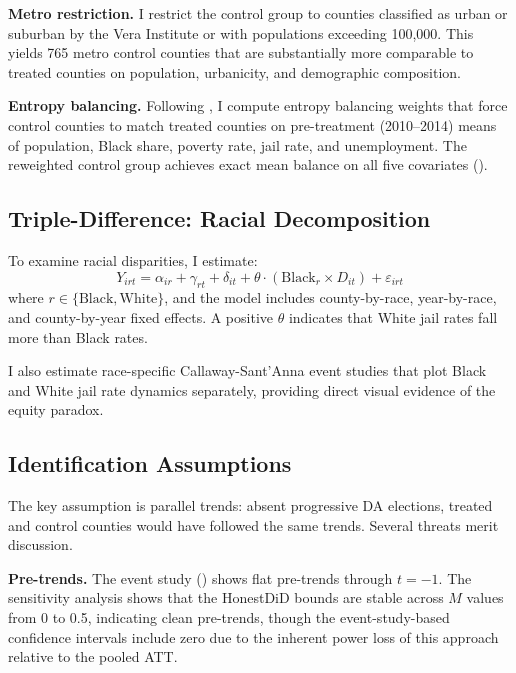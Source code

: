 \documentclass[12pt]{article}
\begin{document}
\textbf{Metro restriction.} I restrict the control group to counties classified as urban or suburban by the Vera Institute or with populations exceeding 100,000. This yields 765 metro control counties that are substantially more comparable to treated counties on population, urbanicity, and demographic composition.

\textbf{Entropy balancing.} Following \citet{hainmueller2012entropy}, I compute entropy balancing weights that force control counties to match treated counties on pre-treatment (2010--2014) means of population, Black share, poverty rate, jail rate, and unemployment. The reweighted control group achieves exact mean balance on all five covariates ().

\subsection{Triple-Difference: Racial Decomposition}

To examine racial disparities, I estimate:
\begin{equation}
Y_{irt} = \alpha_{ir} + \gamma_{rt} + \delta_{it} + \theta \cdot (\text{Black}_r \times D_{it}) + \varepsilon_{irt}
\label{eq:ddd}
\end{equation}
where $r \in \{\text{Black}, \text{White}\}$, and the model includes county-by-race, year-by-race, and county-by-year fixed effects. A positive $\theta$ indicates that White jail rates fall more than Black rates.

I also estimate race-specific Callaway-Sant'Anna event studies that plot Black and White jail rate dynamics separately, providing direct visual evidence of the equity paradox.

\subsection{Identification Assumptions}

The key assumption is parallel trends: absent progressive DA elections, treated and control counties would have followed the same trends. Several threats merit discussion.

\textbf{Pre-trends.} The event study () shows flat pre-trends through $t = -1$. The \citet{rambachan2023honest} sensitivity analysis shows that the HonestDiD bounds are stable across $M$ values from 0 to 0.5, indicating clean pre-trends, though the event-study-based confidence intervals include zero due to the inherent power loss of this approach relative to the pooled ATT.
\end{document}
